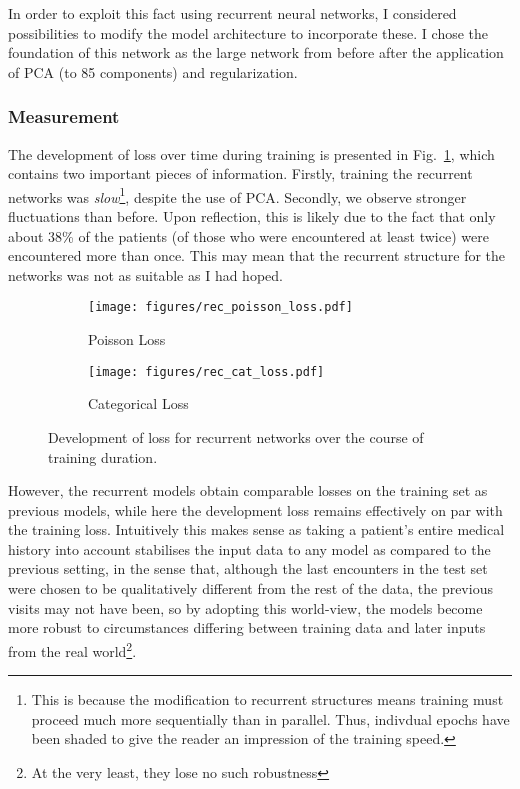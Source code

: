 \documentclass[10pt, twoside, a4paper]{article}
\begin{document}
	In order to exploit this fact using recurrent neural networks,
	I considered possibilities to modify the model architecture to incorporate these. I chose the 
	foundation of this network as the large network from before after the application of PCA 
	(to 85 components) and regularization.

	\subsubsection{Measurement}
	The development of loss over time during training is presented in Fig.\ \ref{fig:recmeasure},
	which contains two important pieces of information. Firstly, training the 
	recurrent networks was \emph{slow}\footnote{This is because the modification to recurrent 
	structures means training must proceed much more sequentially than in parallel. Thus, 
	indivdual epochs have been shaded to give the 
	reader an impression of the training speed.}, despite the use of PCA. Secondly, 
	we observe stronger fluctuations than before. Upon reflection, this is likely due to the 
	fact that only about 38\% of the patients (of those who were encountered at least twice) 
	were encountered more than once. 
	This may mean that the recurrent structure  for the networks was not as suitable as I had hoped. 

	\begin{figure}
		\begin{center}
		\begin{subfigure}[b]{.45\textwidth}
		\texttt{[image: figures/rec\_poisson\_loss.pdf]}
		\caption{Poisson Loss}
		\end{subfigure}
		\quad
		\begin{subfigure}[b]{.45\textwidth}
		\texttt{[image: figures/rec\_cat\_loss.pdf]}
		\caption{Categorical Loss}
		\end{subfigure}
		\end{center}
		\caption{Development of loss for recurrent networks over the course of training duration.}
		\label{fig:recmeasure}
	\end{figure}

	However,  the recurrent models obtain comparable 
	losses on the training set as previous models, 
	while here the development loss remains effectively on par with the training loss. Intuitively this makes sense as taking a
	patient's entire medical history into account stabilises the input data to any model as 
	compared to the previous setting, in the sense that, although the last encounters in the 
	test set were chosen to be qualitatively different from the rest of the data, the 
	previous visits may not have been, so by adopting this world-view, the models 
	become more robust to circumstances differing between training data and later 
	inputs from the real world\footnote{At the very least, they lose no such robustness}. %
\end{document}
